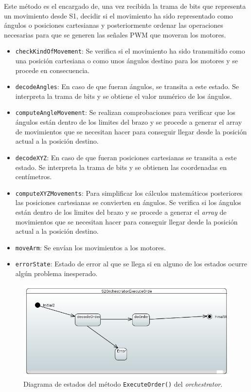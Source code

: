 Este método es el encargado de, una vez recibida la trama de bits que representa un movimiento desde S1, decidir si el movimiento ha sido representado como ángulos o posiciones cartesianas y posteriormente ordenar las operaciones necesarias para que se generen las señales PWM que moveran los motores.

\begin{itemize}
    \item \texttt{checkKindOfMovement}: Se verifica si el movimiento ha sido transmitido como una posición cartesiana o como unos ángulos destino para los motores y se procede en consecuencia.
    \item \texttt{decodeAngles}: En caso de que fueran ángulos, se transita a este estado. Se interpreta la trama de bits y se obtiene el valor numérico de los ángulos.
    \item \texttt{computeAngleMovement}: Se realizan comprobaciones para verificar que los ángulos están dentro de los limites del brazo y se procede a generar el array de movimientos que se necesitan hacer para conseguir llegar desde la posición actual a la posición destino.
    \item \texttt{decodeXYZ}: En caso de que fueran posiciones cartesianas se transita a este estado. Se interpreta la trama de bits y se obtienen las coordenadas en centímetros.
    \item \texttt{computeXYZMovements}: Para simplificar los cálculos matemáticos posteriores las posiciones cartesianas se convierten en ángulos. Se verifica si los ángulos están dentro de los limites del brazo y se procede a generar el \textit{array} de movimientos que se necesitan hacer para conseguir llegar desde la posición actual a la posición destino.
    \item \texttt{moveArm}: Se envían los movimientos a los motores.
    \item \texttt{errorState}: Estado de error al que se llega si en alguno de los estados ocurre algún problema inesperado. 
    
\end{itemize}

\begin{figure}[H]
    \centering
    \includegraphics[width=1\linewidth]{pictures/S2OrchestratorExecuteOrder.PNG}
    \caption{Diagrama de estados del método \texttt{ExecuteOrder()} del \textit{orchestrator}.}
    \label{fig:fun_execute_order_orchestator}
\end{figure}

